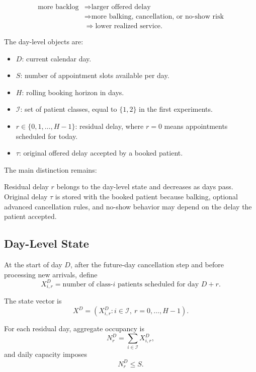 \documentclass[11pt]{article}
\begin{document}
\begin{keybox}[title={Core Feedback Loop}]
\begin{align*}
\text{more backlog}
&\Rightarrow
\text{larger offered delay}\\
&\Rightarrow
\text{more balking, cancellation, or no-show risk}\\
&\Rightarrow
\text{lower realized service}.
\end{align*}
\end{keybox}

The day-level objects are:
\begin{itemize}[nosep]
    \item \(D\): current calendar day.
    \item \(S\): number of appointment slots available per day.
    \item \(H\): rolling booking horizon in days.
    \item \(\mathcal I\): set of patient classes, equal to \(\{1,2\}\) in the first experiments.
    \item \(r\in\{0,1,\dots,H-1\}\): residual delay, where \(r=0\) means appointments scheduled for today.
    \item \(\tau\): original offered delay accepted by a booked patient.
\end{itemize}

The main distinction remains:
\begin{keybox}[title={Residual Delay vs. Original Delay}]
Residual delay \(r\) belongs to the day-level state and decreases as days pass. Original delay
\(\tau\) is stored with the booked patient because balking, optional advanced cancellation rules, and
no-show behavior may depend on the delay the patient accepted.
\end{keybox}

\subsection{Day-Level State}

At the start of day \(D\), after the future-day cancellation step and before processing new arrivals,
define
\[
X_{i,r}^{D}
=
\text{number of class-}i\text{ patients scheduled for day }D+r.
\]

The state vector is
\[
X^D=\left(X_{i,r}^{D}:i\in\mathcal I,\ r=0,\dots,H-1\right).
\]

For each residual day, aggregate occupancy is
\[
N_r^D=\sum_{i\in\mathcal I}X_{i,r}^{D},
\]
and daily capacity imposes
\[
N_r^D\le S.
\]
\end{document}
